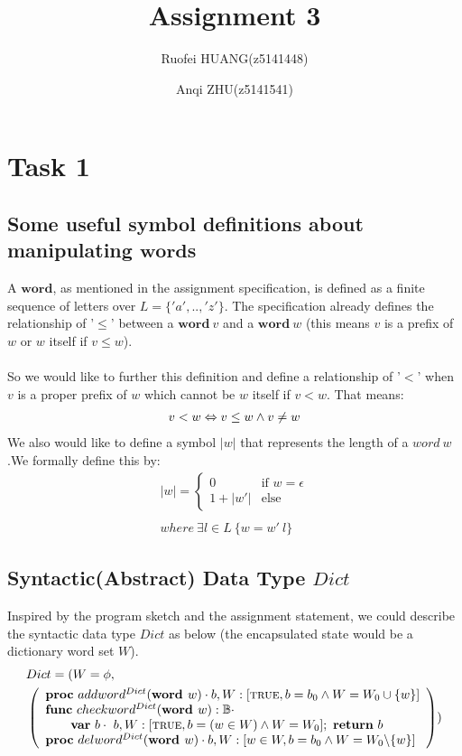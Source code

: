 \documentclass[a4paper,12pt,fleqn]{scrartcl}
\title{Assignment 3}
\author{Ruofei HUANG(z5141448)\and
Anqi ZHU(z5141541)
}
\newcommand{\WORD}{\textbf{word }}
\begin{document}
\maketitle
\section{Task 1}
\subsection{Some useful symbol definitions about manipulating $\textbf{word}$s }
A $\textbf{word}$, as mentioned in the assignment specification, is defined as a 
finite sequence of letters over $L = \{'a', .., 'z'\}$. The specification 
already defines the relationship of '$\leq$' between a $\textbf{word}\ v$ and a 
$\textbf{word}\ w$ (this means $v$ is a prefix of $w$ or $w$ itself if 
$v\leq w$). 
\\\\
So we would like to further this definition and define a relationship of '$<$' 
when $v$ is a proper prefix of $w$ which cannot be $w$ itself if $v < w$. That 
means:
\begin{align*}
    v < w \Leftrightarrow v\leq w \wedge v\neq w
\end{align*}
We also would like to define a symbol $|w|$ that represents the length of a 
$word\ w$.We formally define this by:
\begin{align*}
    |w| = 
    \begin{cases}
        0 & \text{if } w = \epsilon\\
        1 + |w'| & \text{else }
    \end{cases}\\\\
    where\ \exists l\in L\ \{w = w'\ l\}
\end{align*} 
\subsection{Syntactic(Abstract) Data Type $Dict$ }
Inspired by the program sketch and the assignment statement, we could describe 
the syntactic data type $Dict$ as below (the encapsulated state would be a 
dictionary word set $W$).
\begin{align*}
    &Dict = 
    (
        W = \phi,  \\
        &\left( 
            \begin{array}{l}
                \PROC\ addword^{Dict}(\WORD w)\cdot 
                b, W:[\True, b = b_0\And W = W_0\cup \{w\}]\\
                \FUNC\ checkword^{Dict}(\WORD w):\mathbb{B}\cdot\\
                    \qquad 
                    \VAR\ b\cdot\ b, W:[\True, b = (w\in W)\And W = W_0];\ 
                    \RETURN\ b\\
                \PROC\ delword^{Dict}(\WORD w)\cdot
                b, W:[ w\in W, b = b_0\And W = W_0 \backslash \{w\}]
            \end{array}
        \right)
    )
\end{align*}
\end{document}
